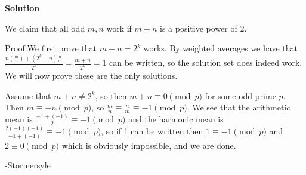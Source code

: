 \begin{enumerate}
\textbf{Solution}

We claim that all odd $m, n$ work if $m+n$ is a positive power of 2.

 Proof:We first prove that $m+n=2^k$ works. By weighted averages we have that $\frac{n(\frac{m}{n})+(2^k-n)\frac{n}{m}}{2^k}=\frac{m+n}{2^k}=1$ can be written, so the solution set does indeed work. We will now prove these are the only solutions.

 Assume that $m+n\ne 2^k$, so then $m+n\equiv 0\pmod{p}$ for some odd prime $p$. Then $m\equiv -n\pmod{p}$, so $\frac{m}{n}\equiv \frac{n}{m}\equiv -1\pmod{p}$. We see that the arithmetic mean is $\frac{-1+(-1)}{2}\equiv -1\pmod{p}$ and the harmonic mean is $\frac{2(-1)(-1)}{-1+(-1)}\equiv -1\pmod{p}$, so if 1 can be written then $1\equiv -1\pmod{p}$ and $2\equiv 0\pmod{p}$ which is obviously impossible, and we are done.

 -Stormersyle

 


\end{enumerate}
